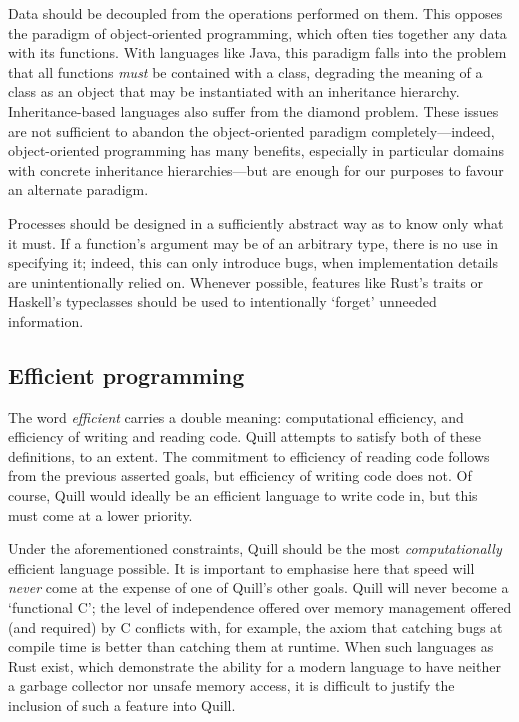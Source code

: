 \documentclass[UKenglish, 11pt, a4paper, parskip=half]{scrbook}
\theoremstyle{definition}
\begin{document}
Data should be decoupled from the operations performed on them.
This opposes the paradigm of object-oriented programming, which often ties together any data with its functions.
With languages like Java, this paradigm falls into the problem that all functions \textit{must} be contained with a class, degrading the meaning of a class as an object that may be instantiated with an inheritance hierarchy.
Inheritance-based languages also suffer from the diamond problem.
These issues are not sufficient to abandon the object-oriented paradigm completely---indeed, object-oriented programming has many benefits, especially in particular domains with concrete inheritance hierarchies---but are enough for our purposes to favour an alternate paradigm.

Processes should be designed in a sufficiently abstract way as to know only what it must.
If a function's argument may be of an arbitrary type, there is no use in specifying it; indeed, this can only introduce bugs, when implementation details are unintentionally relied on.
Whenever possible, features like Rust's traits or Haskell's typeclasses should be used to intentionally `forget' unneeded information.

\subsection{Efficient programming}

The word \textit{efficient} carries a double meaning: computational efficiency, and efficiency of writing and reading code.
Quill attempts to satisfy both of these definitions, to an extent.
The commitment to efficiency of reading code follows from the previous asserted goals, but efficiency of writing code does not.
Of course, Quill would ideally be an efficient language to write code in, but this must come at a lower priority.

Under the aforementioned constraints, Quill should be the most \textit{computationally} efficient language possible.
It is important to emphasise here that speed will \textit{never} come at the expense of one of Quill's other goals.
Quill will never become a `functional C'; the level of independence offered over memory management offered (and required) by C conflicts with, for example, the axiom that catching bugs at compile time is better than catching them at runtime.
When such languages as Rust exist, which demonstrate the ability for a modern language to have neither a garbage collector nor unsafe memory access, it is difficult to justify the inclusion of such a feature into Quill.
\end{document}
